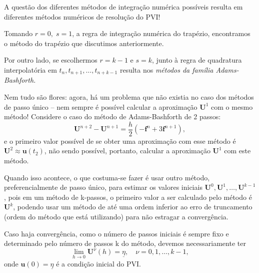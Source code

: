 \documentclass[../differential_methods.tex]{subfiles}
\begin{document}
A questão dos diferentes métodos de integração numérica possíveis resulta em diferentes métodos numéricos de resolução do PVI!

\begin{example}
	Tomando \(r=0,\; s=1\), a regra de integração numérica do trapézio, encontramos o método do trapézio que discutimos anteriormente.

	Por outro lado, se escolhermos \(r=k-1\) e \(s=k\), junto à regra de quadratura interpolatória em \(t_{n}, t_{n+1}, \dotsc , t_{n+k-1}\) resulta nos \textit{métodos da família Adams-Bashforth.}
\end{example}

Nem tudo são flores: agora, há um problema que não existia no caso dos métodos de passo único -- nem sempre é possível calcular a aproximação \(\mathbf{U}^{1}\) com o mesmo método! Considere o caso do método de Adams-Bashforth de 2 passos:
\[
	\mathbf{U}^{n+2} - \mathbf{U}^{n+1} = \frac{h}{2}(-\mathbf{f}^{n} + 3 \mathbf{f}^{n+1}),
\]
e o primeiro valor possível de se obter uma aproximação com esse método é \(\mathbf{U}^{2} \approx \mathbf{u}(t_{2})\), não sendo possível, portanto, calcular a aproximação \(\mathbf{U}^{1}\) com este método.

Quando isso acontece, o que costuma-se fazer é usar outro método, preferencialmente de passo único, para estimar os valores iniciais \(\mathbf{U}^{0}, \mathbf{U}^{1}, \dotsc , \mathbf{U}^{k-1}\), pois em um método de k-passos, o primeiro valor a ser calculado pelo método é \(\mathbf{U}^{k}\), podendo usar um método de até uma ordem inferior ao erro de truncamento (ordem do método que está utilizando) para não estragar a convergência.

Caso haja convergência, como o número de passos iniciais é sempre fixo e determinado pelo número de passos k do método, devemos necessariamente ter
\[
	\lim_{h\to 0}\mathbf{U}^{\nu }(h) = \underline{\eta }, \quad \nu = 0, 1, \dotsc , k-1,
\]
onde \(\mathbf{u}(0) = \underline{\eta }\) é a condição inicial do PVI.
\end{document}

